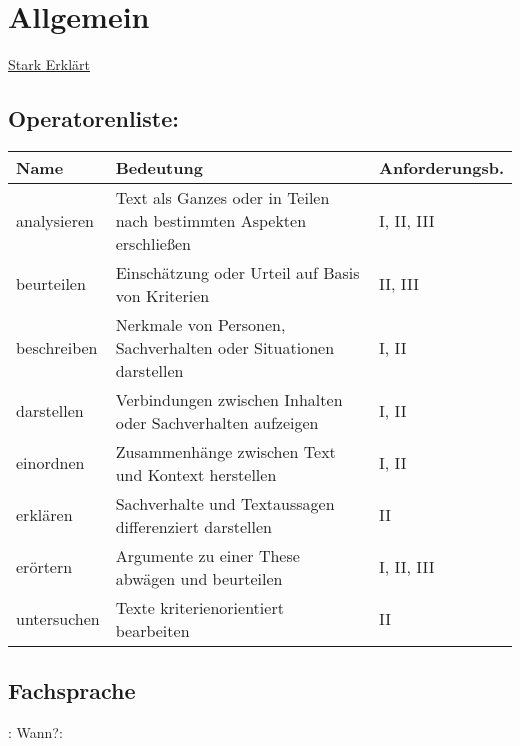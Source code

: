
\section{Allgemein}


 \href{https://www.youtube.com/playlist?list=PLFQhWtJUIAq00wSOlfr-xGlOsD8IETL3G}{Stark Erklärt}

\subsection{Operatorenliste:}

\setlength{\tabcolsep}{4pt}

\renewcommand{\arraystretch}{1.3}
\begin{tabular}{|p{2cm}|p{6.7cm}|p{2.5cm}|}
    \hline
    Name & Bedeutung & Anforderungsb. \\
    \hline
    analysieren & Text als Ganzes oder in Teilen nach bestimmten Aspekten erschließen & I, II, III \\
    \hline
    beurteilen & Einschätzung oder Urteil auf Basis von Kriterien & II, III \\
    \hline
    beschreiben & Nerkmale von Personen, Sachverhalten oder Situationen darstellen & I, II \\
    \hline
    darstellen & Verbindungen zwischen Inhalten oder Sachverhalten aufzeigen & I, II \\
    \hline 
    einordnen & Zusammenhänge zwischen Text und Kontext herstellen & I, II \\
    \hline
    erklären & Sachverhalte und Textaussagen differenziert darstellen & II \\
    \hline
    erörtern & Argumente zu einer These abwägen und beurteilen & I, II, III \\
    \hline 
    untersuchen & Texte kriterienorientiert bearbeiten & II \\
    \hline
\end{tabular}

\subsection{Fachsprache}
: Wann?: 



